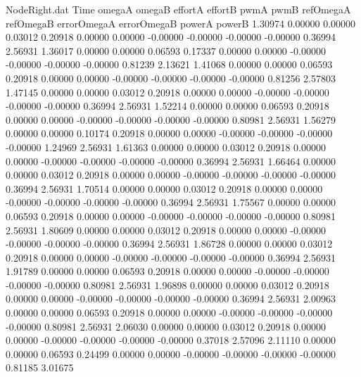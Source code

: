 \begin{filecontents}{NodeRight.dat}
Time omegaA omegaB effortA effortB pwmA pwmB refOmegaA refOmegaB errorOmegaA errorOmegaB powerA powerB
   1.30974    0.00000    0.00000     0.03012    0.20918    0.00000    0.00000   -0.00000   -0.00000   -0.00000   -0.00000    0.36994    2.56931
   1.36017    0.00000    0.00000     0.06593    0.17337    0.00000    0.00000   -0.00000   -0.00000   -0.00000   -0.00000    0.81239    2.13621
   1.41068    0.00000    0.00000     0.06593    0.20918    0.00000    0.00000   -0.00000   -0.00000   -0.00000   -0.00000    0.81256    2.57803
   1.47145    0.00000    0.00000     0.03012    0.20918    0.00000    0.00000   -0.00000   -0.00000   -0.00000   -0.00000    0.36994    2.56931
   1.52214    0.00000    0.00000     0.06593    0.20918    0.00000    0.00000   -0.00000   -0.00000   -0.00000   -0.00000    0.80981    2.56931
   1.56279    0.00000    0.00000     0.10174    0.20918    0.00000    0.00000   -0.00000   -0.00000   -0.00000   -0.00000    1.24969    2.56931
   1.61363    0.00000    0.00000     0.03012    0.20918    0.00000    0.00000   -0.00000   -0.00000   -0.00000   -0.00000    0.36994    2.56931
   1.66464    0.00000    0.00000     0.03012    0.20918    0.00000    0.00000   -0.00000   -0.00000   -0.00000   -0.00000    0.36994    2.56931
   1.70514    0.00000    0.00000     0.03012    0.20918    0.00000    0.00000   -0.00000   -0.00000   -0.00000   -0.00000    0.36994    2.56931
   1.75567    0.00000    0.00000     0.06593    0.20918    0.00000    0.00000   -0.00000   -0.00000   -0.00000   -0.00000    0.80981    2.56931
   1.80609    0.00000    0.00000     0.03012    0.20918    0.00000    0.00000   -0.00000   -0.00000   -0.00000   -0.00000    0.36994    2.56931
   1.86728    0.00000    0.00000     0.03012    0.20918    0.00000    0.00000   -0.00000   -0.00000   -0.00000   -0.00000    0.36994    2.56931
   1.91789    0.00000    0.00000     0.06593    0.20918    0.00000    0.00000   -0.00000   -0.00000   -0.00000   -0.00000    0.80981    2.56931
   1.96898    0.00000    0.00000     0.03012    0.20918    0.00000    0.00000   -0.00000   -0.00000   -0.00000   -0.00000    0.36994    2.56931
   2.00963    0.00000    0.00000     0.06593    0.20918    0.00000    0.00000   -0.00000   -0.00000   -0.00000   -0.00000    0.80981    2.56931
   2.06030    0.00000    0.00000     0.03012    0.20918    0.00000    0.00000   -0.00000   -0.00000   -0.00000   -0.00000    0.37018    2.57096
   2.11110    0.00000    0.00000     0.06593    0.24499    0.00000    0.00000   -0.00000   -0.00000   -0.00000   -0.00000    0.81185    3.01675

\end{filecontents}
